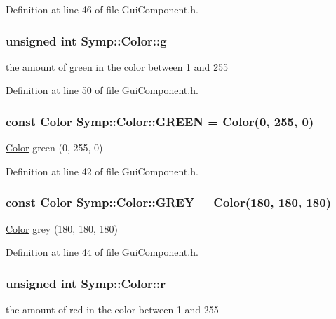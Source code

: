 Definition at line 46 of file Gui\-Component.\-h.

\hypertarget{struct_symp_1_1_color_a9647c7f07beac0f0851609a3ba2db21c}{
\subsubsection[{g}]{\setlength{\rightskip}{0pt plus 5cm}unsigned int Symp\-::\-Color\-::g}}\label{struct_symp_1_1_color_a9647c7f07beac0f0851609a3ba2db21c}
the amount of green in the color between 1 and 255 

Definition at line 50 of file Gui\-Component.\-h.

\hypertarget{struct_symp_1_1_color_af8e6c9ee96133ee641e9b48a1eae788b}{
\subsubsection[{G\-R\-E\-E\-N}]{\setlength{\rightskip}{0pt plus 5cm}const {\bf Color} Symp\-::\-Color\-::\-G\-R\-E\-E\-N = {\bf Color}(0, 255, 0)\hspace{0.3cm}{\ttfamily [static]}}}\label{struct_symp_1_1_color_af8e6c9ee96133ee641e9b48a1eae788b}
\hyperlink{struct_symp_1_1_color}{Color} green (0, 255, 0) 

Definition at line 42 of file Gui\-Component.\-h.

\hypertarget{struct_symp_1_1_color_ae40a5f0273adf627d6ff49fa0e5669d8}{
\subsubsection[{G\-R\-E\-Y}]{\setlength{\rightskip}{0pt plus 5cm}const {\bf Color} Symp\-::\-Color\-::\-G\-R\-E\-Y = {\bf Color}(180, 180, 180)\hspace{0.3cm}{\ttfamily [static]}}}\label{struct_symp_1_1_color_ae40a5f0273adf627d6ff49fa0e5669d8}
\hyperlink{struct_symp_1_1_color}{Color} grey (180, 180, 180) 

Definition at line 44 of file Gui\-Component.\-h.

\hypertarget{struct_symp_1_1_color_aa793f972ed87529d8b841d601a575faa}{
\subsubsection[{r}]{\setlength{\rightskip}{0pt plus 5cm}unsigned int Symp\-::\-Color\-::r}}\label{struct_symp_1_1_color_aa793f972ed87529d8b841d601a575faa}
the amount of red in the color between 1 and 255 

